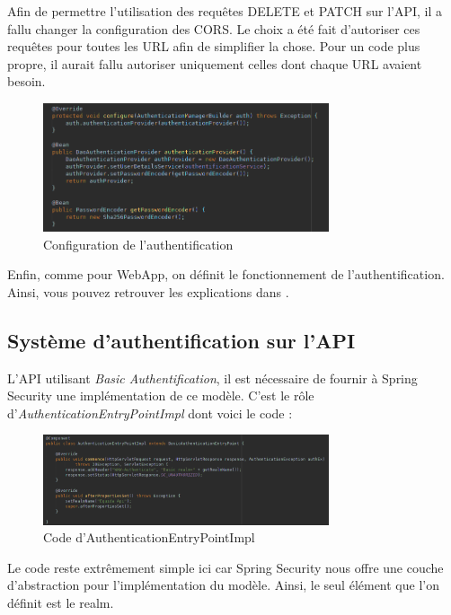 			\noindent
			Afin de permettre l'utilisation des requêtes DELETE et PATCH sur l'API, il a fallu changer la configuration des CORS. Le choix a été fait d'autoriser ces requêtes pour toutes les URL afin de simplifier la chose. Pour un code plus propre, il aurait fallu autoriser uniquement celles dont chaque URL avaient besoin.

			\begin{figure}[H]
				\centering\includegraphics[width=0.75\textwidth, keepaspectratio]{res/config-authentification.png}
				\caption{Configuration de l'authentification}
			\end{figure}

			\noindent
			Enfin, comme pour WebApp, on définit le fonctionnement de l'authentification. Ainsi, vous pouvez retrouver les explications dans .

		\subsection{Système d'authentification sur l'API}
			\label{subsec:basic_auth}

			L'API utilisant \textit{Basic Authentification}, il est nécessaire de fournir à Spring Security une implémentation de ce modèle. C'est le rôle d'\textit{AuthenticationEntryPointImpl} dont voici le code :

			\begin{figure}[H]
				\centering\includegraphics[width=0.75\textwidth, keepaspectratio]{res/AuthenticationEntryPointImpl.png}
				\caption{Code d'AuthenticationEntryPointImpl}
			\end{figure}

			\noindent
			Le code reste extrêmement simple ici car Spring Security nous offre une couche d'abstraction pour l'implémentation du modèle. Ainsi, le seul élément que l'on définit est le realm.

